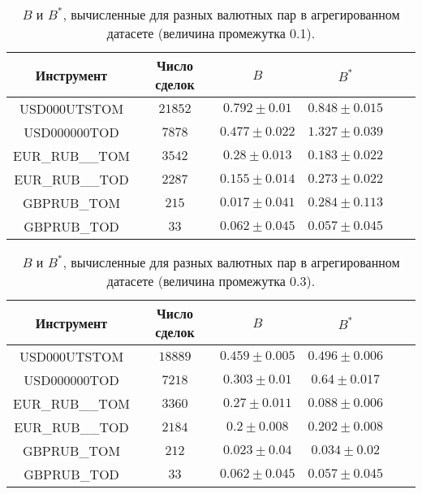 \begin{table}[h!]
    \begin{center}
        \begin{tabular}{|c|c|c|c|c|c|}
            \hline
            Инструмент      & Число сделок & $B$               & $B ^*$            \\ \hline
            USD000UTSTOM    & $21852$      & $0.792 \pm 0.01$  & $0.848 \pm 0.015$ \\ \hline
            USD000000TOD    & $7878$       & $0.477 \pm 0.022$ & $1.327 \pm 0.039$ \\ \hline
            EUR\_RUB\_\_TOM & $3542$       & $0.28 \pm 0.013$  & $0.183 \pm 0.022$ \\ \hline
            EUR\_RUB\_\_TOD & $2287$       & $0.155 \pm 0.014$ & $0.273 \pm 0.022$ \\ \hline
            GBPRUB\_TOM     & $215$        & $0.017 \pm 0.041$ & $0.284 \pm 0.113$ \\ \hline
            GBPRUB\_TOD     & $33$         & $0.062 \pm 0.045$ & $0.057 \pm 0.045$ \\ \hline

        \end{tabular}
    \end{center}
    \caption{$B$ и $B ^*$, вычисленные для разных валютных пар в агрегированном датасете (величина промежутка 0.1).}
    \label{Aggreg1CU}
\end{table}
\begin{table}[h!]
    \begin{center}
        \begin{tabular}{|c|c|c|c|c|c|}
            \hline
            Инструмент      & Число сделок & $B$               & $B ^*$            \\ \hline
            USD000UTSTOM    & $18889$      & $0.459 \pm 0.005$ & $0.496 \pm 0.006$ \\ \hline
            USD000000TOD    & $7218$       & $0.303 \pm 0.01$  & $0.64 \pm 0.017$  \\ \hline
            EUR\_RUB\_\_TOM & $3360$       & $0.27 \pm 0.011$  & $0.088 \pm 0.006$ \\ \hline
            EUR\_RUB\_\_TOD & $2184$       & $0.2 \pm 0.008$   & $0.202 \pm 0.008$ \\ \hline
            GBPRUB\_TOM     & $212$        & $0.023 \pm 0.04$  & $0.034 \pm 0.02$  \\ \hline
            GBPRUB\_TOD     & $33$         & $0.062 \pm 0.045$ & $0.057 \pm 0.045$ \\ \hline

        \end{tabular}
    \end{center}
    \caption{$B$ и $B ^*$, вычисленные для разных валютных пар в агрегированном датасете (величина промежутка 0.3).}
    \label{Aggreg1CU}
\end{table}

